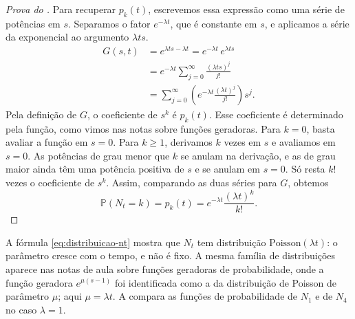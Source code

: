 \documentclass[12pt,portuguese]{article}
\theoremstyle{definition}
\theoremstyle{plainexercise}
\theoremstyle{starredexercise}
\theoremstyle{definition}
\begin{document}
\begin{proof}[Prova do ]
Para recuperar $p_k(t)$, escrevemos essa expressão como uma série de
potências em $s$. Separamos o fator $e^{-\lambda t}$, que é constante
em $s$, e aplicamos a série da exponencial ao argumento $\lambda t s$.
\begin{align*}
  G(s,t)
  &=e^{\lambda t s-\lambda t}
  =e^{-\lambda t}\,e^{\lambda t s}\\
  &=e^{-\lambda t}\sum_{j=0}^{\infty}\frac{(\lambda t s)^j}{j!}\\
  &=\sum_{j=0}^{\infty}\left(e^{-\lambda t}\frac{(\lambda t)^j}{j!}\right)s^j.
\end{align*}
Pela definição de $G$, o coeficiente de $s^k$ é $p_k(t)$. Esse
coeficiente é determinado pela função, como vimos nas notas sobre
funções geradoras. Para $k=0$, basta avaliar a função em $s=0$. Para
$k\geqslant1$, derivamos $k$ vezes em $s$ e avaliamos em $s=0$.
As potências de grau menor que $k$ se anulam na derivação, e as de grau
maior ainda têm uma potência positiva de $s$ e se anulam em $s=0$.
Só resta $k!$ vezes o coeficiente de $s^k$. Assim, comparando as duas
séries para $G$, obtemos
\[
  \mathbb{P}(N_t=k)=p_k(t)=e^{-\lambda t}\frac{(\lambda t)^k}{k!}.
\]
\end{proof}

A fórmula \eqref{eq:distribuicao-nt} mostra que $N_t$ tem distribuição
$\mathrm{Poisson}(\lambda t)$: o parâmetro cresce com o tempo, e não é fixo. A
mesma família de distribuições aparece nas notas de aula sobre funções
geradoras de probabilidade, onde a função geradora $e^{\mu(s-1)}$ foi
identificada como a da distribuição de Poisson de parâmetro $\mu$; aqui
$\mu=\lambda t$. A  compara as funções de
probabilidade de $N_1$ e de $N_4$ no caso $\lambda=1$.
\end{document}
